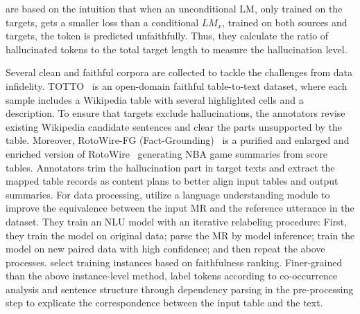 \vspace{-0.5em} 
 are based on the intuition that when an unconditional LM, only trained on the targets, gets a smaller loss than a conditional $LM_x$, trained on both sources and targets, the token is predicted unfaithfully. Thus, they calculate the ratio of hallucinated tokens to the total target length to measure the hallucination level.

\label{subsec:mitigation in data2text}

Several clean and faithful corpora are collected to tackle the challenges from data infidelity. 
TOTTO~ is an open-domain faithful table-to-text dataset, where each sample includes a Wikipedia table with several highlighted cells and a description. 
To ensure that targets exclude hallucinations, the annotators revise existing Wikipedia candidate sentences and clear the parts unsupported by the table.  
Moreover, RotoWire-FG (Fact-Grounding)~ is a purified and enlarged and enriched version of RotoWire~ generating NBA game summaries from score tables.
Annotators trim the hallucination part in target texts and extract the mapped table records as content plans to better align input tables and output summaries.
For data processing, 
 utilize a language understanding module to improve the equivalence between the input MR and the reference utterance in the dataset.
They train an NLU model with an iterative relabeling procedure: 
First, they train the model on original data; parse the MR by model inference; train the model on new paired data with high confidence; and then repeat the above processes.
 select training instances based on faithfulness ranking. Finer-grained than the above instance-level method,  label tokens according to co-occurrence analysis and sentence structure through dependency parsing in the pre-processing step to explicate the correspondence between the input table and the text. 

